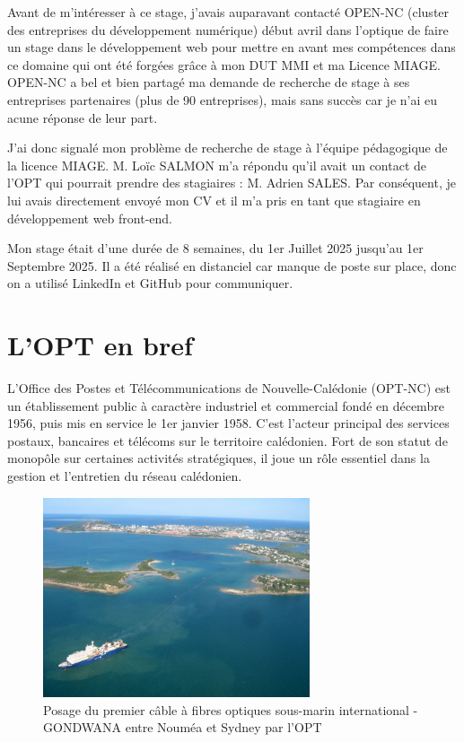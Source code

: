 \documentclass[12pt,a4paper]{report}
\begin{document}
\vspace{1cm}
Avant de m'intéresser à ce stage, j'avais auparavant contacté OPEN-NC (cluster des entreprises du développement numérique) début avril dans l'optique de faire un stage dans le développement web pour mettre en avant mes compétences dans ce domaine qui ont été forgées grâce à mon DUT MMI et ma Licence MIAGE. OPEN-NC a bel et bien partagé ma demande de recherche de stage à ses entreprises partenaires (plus de 90 entreprises), mais sans succès car je n'ai eu acune réponse de leur part.

\vspace{1cm}
J'ai donc signalé mon problème de recherche de stage à l'équipe pédagogique de la licence MIAGE. M. Loïc SALMON m'a répondu qu'il avait un contact de l'OPT qui pourrait prendre des stagiaires : M. Adrien SALES. Par conséquent, je lui avais directement envoyé mon CV et il m'a pris en tant que stagiaire en développement web front-end.

\vspace{1cm}
Mon stage était d'une durée de 8 semaines, du 1er Juillet 2025 jusqu'au 1er Septembre 2025. Il a été réalisé en distanciel car manque de poste sur place, donc on a utilisé LinkedIn et GitHub pour communiquer.


\section{L'OPT en bref}
L’Office des Postes et Télécommunications de Nouvelle-Calédonie (OPT-NC) est un établissement public à caractère industriel et commercial fondé en décembre 1956, puis mis en service le 1er janvier 1958. C'est l’acteur principal des services postaux, bancaires et télécoms sur le territoire calédonien. Fort de son statut de monopôle sur certaines activités stratégiques, il joue un rôle essentiel dans la gestion et l'entretien du réseau calédonien.

\vspace{1cm}

\begin{figure}[h] %
    \centering
    \includegraphics[width=0.7\textwidth]{ressources_rapport/pose-cable-gondwana.jpg}
    \caption{Posage du premier câble à fibres optiques sous-marin international - GONDWANA entre Nouméa et Sydney par l'OPT}
\end{figure}
\newpage
\end{document}
